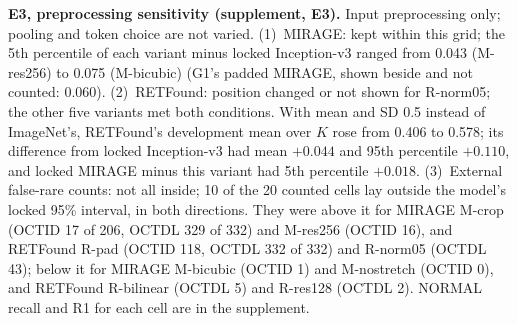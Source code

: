 \documentclass[conference]{IEEEtran}
\begin{document}
\textbf{E3, preprocessing sensitivity (supplement, E3).} Input preprocessing only; pooling and token choice are not varied. (1)~MIRAGE: kept within this grid; the 5th percentile of each variant minus locked Inception-v3 ranged from 0.043 (M-res256) to 0.075 (M-bicubic) (G1's padded MIRAGE, shown beside and not counted: 0.060). (2)~RETFound: position changed or not shown for R-norm05; the other five variants met both conditions. With mean and SD 0.5 instead of ImageNet's, RETFound's development mean over $K$ rose from 0.406 to 0.578; its difference from locked Inception-v3 had mean $+0.044$ and 95th percentile $+0.110$, and locked MIRAGE minus this variant had 5th percentile $+0.018$. (3)~External false-rare counts: not all inside; 10 of the 20 counted cells lay outside the model's locked 95\% interval, in both directions. They were above it for MIRAGE M-crop (OCTID 17 of 206, OCTDL 329 of 332) and M-res256 (OCTID 16), and RETFound R-pad (OCTID 118, OCTDL 332 of 332) and R-norm05 (OCTDL 43); below it for MIRAGE M-bicubic (OCTID 1) and M-nostretch (OCTID 0), and RETFound R-bilinear (OCTDL 5) and R-res128 (OCTDL 2). NORMAL recall and R1 for each cell are in the supplement.
\end{document}
